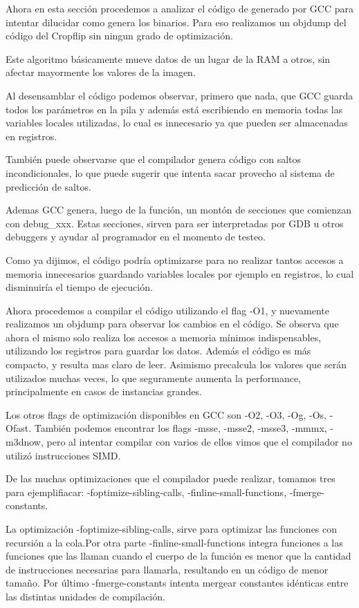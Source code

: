 \documentclass[a4paper]{article}
\begin{document}
Ahora en esta sección procedemos a analizar el código de generado por GCC para intentar dilucidar como genera los binarios. Para eso realizamos un objdump del código del Cropflip sin ningun grado de optimización.

Este algoritmo básicamente mueve datos de un lugar de la RAM a otros, sin afectar mayormente los valores de la imagen.

Al desensamblar el código podemos observar, primero que nada, que GCC guarda todos los parámetros en la pila y además está escribiendo en memoria todas las variables locales utilizadas, lo cual es innecesario ya que pueden ser almacenadas en registros.

También puede observarse que el compilador genera código con saltos incondicionales, lo que puede sugerir que intenta sacar provecho al sistema de predicción de saltos.

Ademas GCC genera, luego de la función, un montón de secciones que comienzan con debug_xxx. Estas secciones, sirven para ser interpretadas por GDB u otros debuggers y ayudar al programador en el momento de testeo.

Como ya dijimos, el código podría optimizarse para no realizar tantos accesos a memoria innecesarios guardando variables locales por ejemplo en registros, lo cual disminuiría el tiempo de ejecución.

Ahora procedemos a compilar el código utilizando el flag -O1, y nuevamente realizamos un objdump para observar los cambios en el código. Se observa que ahora el mismo solo realiza los accesos a memoria mínimos indispensables, utilizando los registros para guardar los datos. Además el código es más compacto, y resulta mas claro de leer. Asimismo precalcula los valores que serán utilizados muchas veces, lo que seguramente aumenta la performance, principalmente en casos de instancias grandes.

Los otros flags de optimización disponibles en GCC son -O2, -O3, -Og, -Os, -Ofast. También podemos encontrar los flags -msse, -msse2, -msse3, -mmmx, -m3dnow, pero al intentar compilar con varios de ellos vimos que el compilador no utilizó instrucciones SIMD.

De las muchas optimizaciones que el compilador puede realizar, tomamos tres para ejemplifiacar: -foptimize-sibling-calls, -finline-small-functions, -fmerge-constants.

La optimización -foptimize-sibling-calls, sirve para optimizar las funciones con recursión a la cola.Por otra parte -finline-small-functions integra funciones a las funciones que las llaman cuando el cuerpo de la función es menor que la cantidad de instrucciones necesarias para llamarla, resultando en un código de menor tamaño. Por último -fmerge-constants intenta mergear constantes idénticas entre las distintas unidades de compilación.
\end{document}
